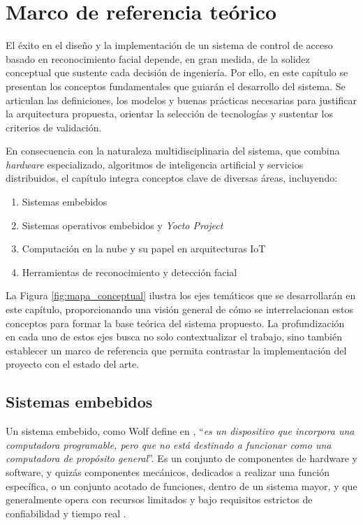 \chapter{Marco  de referencia teórico}
\label{ch:marco}

El éxito en el diseño y la implementación de un sistema de control de acceso basado en reconocimiento facial depende, en gran medida, de la solidez conceptual que sustente cada decisión de ingeniería. Por ello, en este capítulo se presentan los conceptos fundamentales que guiarán el desarrollo del sistema. Se articulan las definiciones, los modelos y buenas prácticas necesarias para justificar la arquitectura propuesta, orientar la selección de tecnologías y sustentar los criterios de validación.

En consecuencia con la naturaleza multidisciplinaria del sistema, que combina \textit{hardware} especializado, algoritmos de inteligencia artificial y servicios distribuidos, el capítulo integra conceptos clave de diversas áreas, incluyendo:

\begin{enumerate}
    \item Sistemas embebidos
    \item Sistemas operativos embebidos y \textit{Yocto Project}
    \item Computación en la nube y su papel en arquitecturas IoT
    \item Herramientas de reconocimiento y detección facial
\end{enumerate}

La Figura \ref{fig:mapa_conceptual} ilustra los ejes temáticos que se desarrollarán en este capítulo, proporcionando una visión general de cómo se interrelacionan estos conceptos para formar la base teórica del sistema propuesto. La profundización en cada uno de estos ejes busca no solo contextualizar el trabajo, sino también establecer un marco de referencia que permita contrastar la implementación del proyecto con el estado del arte.

\clearpage

\begin{figure*}[h!]
    \centering
    
    \caption{Mapa conceptual de los ejes temáticos del sistema propuesto.}
    \label{fig:mapa_conceptual}
\end{figure*}

\section{Sistemas embebidos}
Un sistema embebido, como Wolf define en \cite{wolf_embedded_2012}, ``\textit{es un dispositivo que incorpora una computadora programable, pero que no está destinado a funcionar como una computadora de propósito general}''. Es un conjunto de componentes de hardware y software, y quizás componentes mecánicos, dedicados a realizar una función específica, o un conjunto acotado de funciones, dentro de un sistema mayor, y que generalmente opera con recursos limitados y bajo requisitos estrictos de confiabilidad y tiempo real \cite{barr_embedded_1999}.


